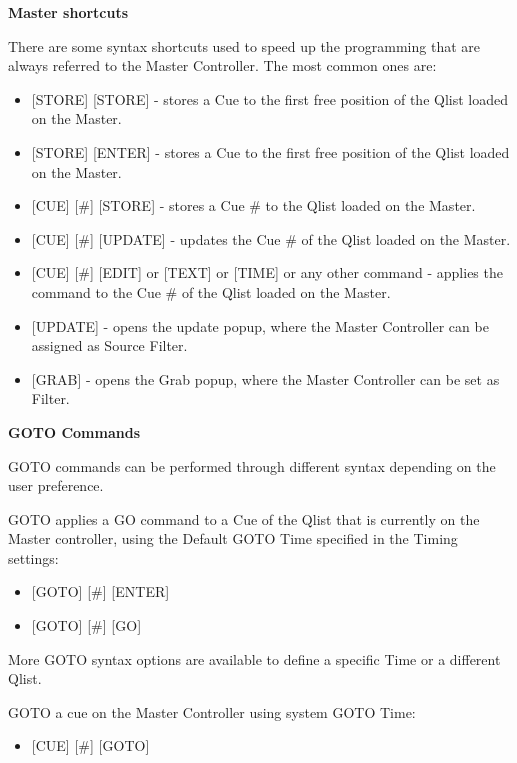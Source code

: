 \documentclass[
]{article}
\providecommand{\tightlist}{%
  \setlength{\itemsep}{0pt}\setlength{\parskip}{0pt}}
\begin{document}
\textbf{Master shortcuts}

There are some syntax shortcuts used to speed up the programming that are always referred to the Master Controller. The most common ones are:

\begin{itemize}
\item
  {[}STORE{]} {[}STORE{]} - stores a Cue to the first free position of the Qlist loaded on the Master.
\item
  {[}STORE{]} {[}ENTER{]} - stores a Cue to the first free position of the Qlist loaded on the Master.
\item
  {[}CUE{]} {[}\#{]} {[}STORE{]} - stores a Cue \# to the Qlist loaded on the Master.
\item
  {[}CUE{]} {[}\#{]} {[}UPDATE{]} - updates the Cue \# of the Qlist loaded on the Master.
\item
  {[}CUE{]} {[}\#{]} {[}EDIT{]} or {[}TEXT{]} or {[}TIME{]} or any other command - applies the command to the Cue \# of the Qlist loaded on the Master.
\item
  {[}UPDATE{]} - opens the update popup, where the Master Controller can be assigned as Source Filter.
\item
  {[}GRAB{]} - opens the Grab popup, where the Master Controller can be set as Filter.
\end{itemize}

\textbf{GOTO Commands}

GOTO commands can be performed through different syntax depending on the user preference.

GOTO applies a GO command to a Cue of the Qlist that is currently on the Master controller, using the Default GOTO Time specified in the Timing settings:

\begin{itemize}
\item
  {[}GOTO{]} {[}\#{]} {[}ENTER{]}
\item
  {[}GOTO{]} {[}\#{]} {[}GO{]}
\end{itemize}

More GOTO syntax options are available to define a specific Time or a different Qlist.

GOTO a cue on the Master Controller using system GOTO Time:

\begin{itemize}
\tightlist
\item
  {[}CUE{]} {[}\#{]} {[}GOTO{]}
\end{itemize}
\end{document}
